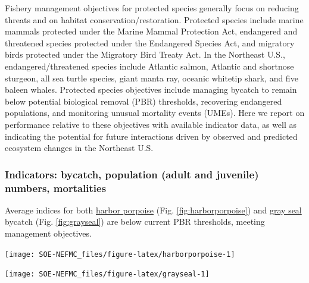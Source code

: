 \documentclass[
  10pt,
]{article}
\let\origfigure\figure
\let\endorigfigure\endfigure
\renewenvironment{figure}[1][2] {
    \expandafter\origfigure\expandafter[H]
} {
    \endorigfigure
}
\begin{document}
Fishery management objectives for protected species generally focus on reducing threats and on habitat conservation/restoration. Protected species include marine mammals protected under the Marine Mammal Protection Act, endangered and threatened species protected under the Endangered Species Act, and migratory birds protected under the Migratory Bird Treaty Act. In the Northeast U.S., endangered/threatened species include Atlantic salmon, Atlantic and shortnose sturgeon, all sea turtle species, giant manta ray, oceanic whitetip shark, and five baleen whales. Protected species objectives include managing bycatch to remain below potential biological removal (PBR) thresholds, recovering endangered populations, and monitoring unusual mortality events (UMEs). Here we report on performance relative to these objectives with available indicator data, as well as indicating the potential for future interactions driven by observed and predicted ecosystem changes in the Northeast U.S.

\hypertarget{indicators-bycatch-population-adult-and-juvenile-numbers-mortalities}{%
\subsubsection{Indicators: bycatch, population (adult and juvenile) numbers, mortalities}\label{indicators-bycatch-population-adult-and-juvenile-numbers-mortalities}}

Average indices for both \href{https://noaa-edab.github.io/catalog/harborporpoise.html}{harbor porpoise} (Fig. \ref{fig:harborporpoise}) and \href{https://noaa-edab.github.io/catalog/grayseal.html}{gray seal} bycatch (Fig. \ref{fig:grayseal}) are below current PBR thresholds, meeting management objectives.

\begin{figure}

{\centering \texttt{[image: SOE-NEFMC\_files/figure-latex/harborporpoise-1]} 

}

\caption{Harbor porpoise average bycatch estimate for Mid-Atlantic and New England gillnet fisheries (blue) and the potential biological removal (red).}\label{fig:harborporpoise}
\end{figure}
\begin{figure}

{\centering \texttt{[image: SOE-NEFMC\_files/figure-latex/grayseal-1]} 

}

\caption{Gray Seal average bycatch estimate for gillnet fisheries (blue) and the potential biological removal (red).}\label{fig:grayseal}
\end{figure}
\end{document}
